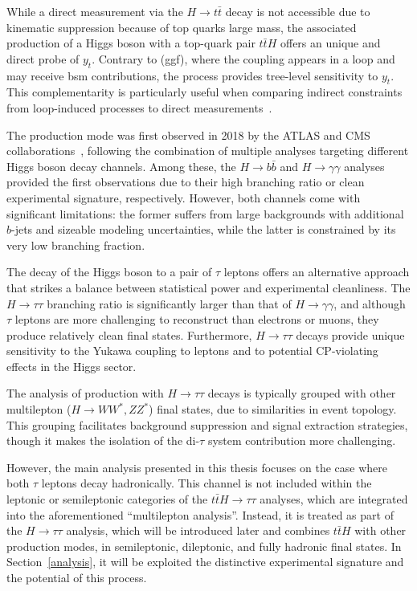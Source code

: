 While a direct measurement via the $H\to t\bar{t}$ decay is not accessible due to kinematic suppression because of top quarks large mass, the associated production of a Higgs boson with a top-quark pair $t\bar{t}H$ offers an unique and direct probe of $y_t$. Contrary to (\acrshort{ggf}), where the coupling appears in a loop and may receive \acrshort{bsm} contributions, the \ttH process provides tree-level sensitivity to $y_t$. This complementarity is particularly useful when comparing indirect constraints from loop-induced processes to direct measurements~\cite{Ng:1983jm,Kunszt:1984ri,Beenakker:2001rj}.

The \ttH production mode was first observed in 2018 by the ATLAS and CMS collaborations~\cite{ATLAS:2018mme,CMS:2018uxb}, following the combination of multiple analyses targeting different Higgs boson decay channels. Among these, the $H\to b \bar{b}$ and $H\to \gamma \gamma$ analyses provided the first observations due to their high branching ratio or clean experimental signature, respectively. However, both channels come with significant limitations: the former suffers from large backgrounds with additional $b$-jets and sizeable modeling uncertainties, while the latter is constrained by its very low branching fraction.

The decay of the Higgs boson to a pair of $\tau$ leptons offers an alternative approach that strikes a balance between statistical power and experimental cleanliness. The $H\to\tau\tau$ branching ratio is significantly larger than that of $H\to \gamma \gamma$, and although $\tau$ leptons are more challenging to reconstruct than electrons or muons, they produce relatively clean final states. Furthermore, $H\to\tau\tau$ decays provide unique sensitivity to the Yukawa coupling to leptons and to potential CP-violating effects in the Higgs sector.

The analysis of \ttH production with $H\to\tau\tau$ decays is typically grouped with other multilepton ($H\to WW^*, ZZ^*$) final states, due to similarities in event topology. This grouping facilitates background suppression and signal extraction strategies, though it makes the isolation of the di-$\tau$ system contribution more challenging. 

However, the main analysis presented in this thesis focuses on the case where both $\tau$ leptons decay hadronically. This channel is not included within the leptonic or semileptonic categories of the $t\bar{t}H \to \tau\tau$ analyses, which are integrated into the aforementioned ``multilepton analysis''. Instead, it is treated as part of the $H\to\tau\tau$ analysis, which will be introduced later and combines $t\bar{t}H$ with other production modes, in semileptonic, dileptonic, and fully hadronic final states. In Section~\ref{analysis}, it will be exploited the distinctive experimental signature and the potential of this process.



